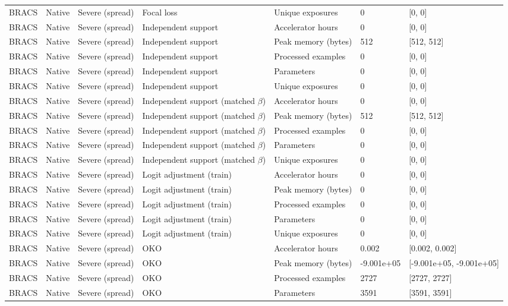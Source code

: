 \begin{longtable}{lllllll}
BRACS & Native & Severe (spread) & Focal loss & Unique exposures & 0 & [0, 0] \\
BRACS & Native & Severe (spread) & Independent support & Accelerator hours & 0 & [0, 0] \\
BRACS & Native & Severe (spread) & Independent support & Peak memory (bytes) & 512 & [512, 512] \\
BRACS & Native & Severe (spread) & Independent support & Processed examples & 0 & [0, 0] \\
BRACS & Native & Severe (spread) & Independent support & Parameters & 0 & [0, 0] \\
BRACS & Native & Severe (spread) & Independent support & Unique exposures & 0 & [0, 0] \\
BRACS & Native & Severe (spread) & Independent support (matched $\beta$) & Accelerator hours & 0 & [0, 0] \\
BRACS & Native & Severe (spread) & Independent support (matched $\beta$) & Peak memory (bytes) & 512 & [512, 512] \\
BRACS & Native & Severe (spread) & Independent support (matched $\beta$) & Processed examples & 0 & [0, 0] \\
BRACS & Native & Severe (spread) & Independent support (matched $\beta$) & Parameters & 0 & [0, 0] \\
BRACS & Native & Severe (spread) & Independent support (matched $\beta$) & Unique exposures & 0 & [0, 0] \\
BRACS & Native & Severe (spread) & Logit adjustment (train) & Accelerator hours & 0 & [0, 0] \\
BRACS & Native & Severe (spread) & Logit adjustment (train) & Peak memory (bytes) & 0 & [0, 0] \\
BRACS & Native & Severe (spread) & Logit adjustment (train) & Processed examples & 0 & [0, 0] \\
BRACS & Native & Severe (spread) & Logit adjustment (train) & Parameters & 0 & [0, 0] \\
BRACS & Native & Severe (spread) & Logit adjustment (train) & Unique exposures & 0 & [0, 0] \\
BRACS & Native & Severe (spread) & OKO & Accelerator hours & 0.002 & [0.002, 0.002] \\
BRACS & Native & Severe (spread) & OKO & Peak memory (bytes) & -9.001e+05 & [-9.001e+05, -9.001e+05] \\
BRACS & Native & Severe (spread) & OKO & Processed examples & 2727 & [2727, 2727] \\
BRACS & Native & Severe (spread) & OKO & Parameters & 3591 & [3591, 3591] \\

\end{longtable}
